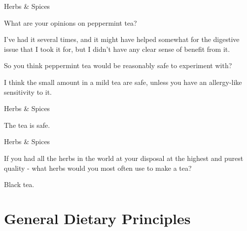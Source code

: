 \documentclass[11pt,oneside,openany,extrafontsizes]{memoir}
\begin{document}
\begin{emailexchange}{Herbs \& Spices}

    \begin{question}
        What are your opinions on peppermint tea?
    \end{question}

    \begin{answer}
       I've had it several times, and it might have helped somewhat for the digestive issue that I took it for, but I didn't have any clear sense of benefit from it. 
    \end{answer}

    \begin{question}
        So you think peppermint tea would be reasonably safe to experiment with?
    \end{question}

    \begin{answer}
       I think the small amount in a mild tea are safe, unless you have an allergy-like sensitivity to it. 
    \end{answer}
\end{emailexchange}

\begin{standalonequote}{Herbs \& Spices}

    \begin{answer}
      The tea is safe.
    \end{answer}
\end{standalonequote}

\begin{qaexchange}{Herbs \& Spices}

    \begin{question}
        If you had all the herbs in the world at your disposal at the highest and purest quality - what herbs would you most often use to make a tea? 
    \end{question}

    \begin{answer}
       Black tea.
    \end{answer}
\end{qaexchange}

\section{General Dietary Principles}
\end{document}
